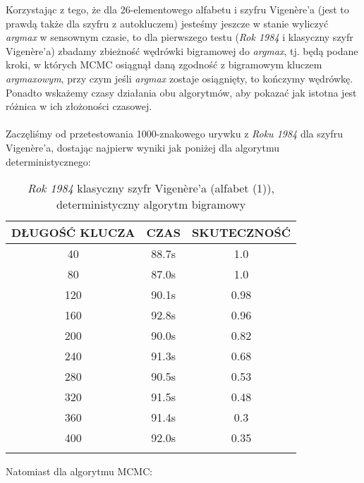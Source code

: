 \documentclass[a4paper]{article}
\theoremstyle{defn}
\theoremstyle{theorem}
\theoremstyle{lemma}
\theoremstyle{cor}
\theoremstyle{fact}
\begin{document}
Korzystając z tego, że dla 26-elementowego alfabetu i szyfru Vigenère'a (jest to prawdą także dla szyfru z autokluczem) jesteśmy jeszcze w stanie wyliczyć \textit{argmax} w sensownym czasie, to dla pierwszego testu (\textit{Rok 1984} i klasyczny szyfr Vigenère'a) zbadamy zbieżność wędrówki bigramowej do \textit{argmax}, tj. będą podane kroki, w których MCMC osiągnął daną zgodność z bigramowym kluczem \textit{argmaxowym}, przy czym jeśli \textit{argmax} zostaje osiągnięty, to kończymy wędrówkę. Ponadto wskażemy czasy działania obu algorytmów, aby pokazać jak istotna jest różnica w ich złożoności czasowej.\\\\
Zaczęliśmy od przetestowania 1000-znakowego urywku z \textit{Roku 1984} dla szyfru Vigenère'a, dostając najpierw wyniki jak poniżej dla algorytmu deterministycznego:
\begin{center}\begin{longtable}{|c|c|c|}
\hline DŁUGOŚĆ KLUCZA & CZAS & SKUTECZNOŚĆ \\ \hline
40 & 88.7s & 1.0 \\ \hline
80 & 87.0s & 1.0 \\ \hline
120 & 90.1s & 0.98 \\ \hline
160 & 92.8s & 0.96 \\ \hline
200 & 90.0s & 0.82 \\ \hline
240 & 91.3s & 0.68 \\ \hline
280 & 90.5s & 0.53 \\ \hline
320 & 91.5s & 0.48 \\ \hline
360 & 91.4s & 0.3 \\ \hline
400 & 92.0s & 0.35 \\ \hline
\caption{\textit{Rok 1984} klasyczny szyfr Vigenère'a (alfabet (1)), deterministyczny algorytm bigramowy}
\end{longtable}\end{center}
Natomiast dla algorytmu MCMC:
\end{document}
